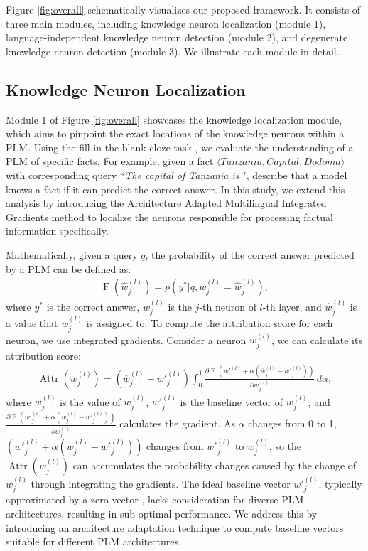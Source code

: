 \documentclass[]{article}
\begin{document}
Figure \ref{fig:overall} schematically visualizes our proposed framework. It consists of three main modules, including knowledge neuron localization (module 1), language-independent knowledge neuron detection (module 2), and degenerate knowledge neuron detection (module 3). We illustrate each module in detail.
\subsection{Knowledge Neuron Localization}
Module 1 of Figure \ref{fig:overall} showcases the knowledge localization module, which aims to pinpoint the exact locations of the knowledge neurons within a PLM. Using the fill-in-the-blank cloze task \cite{fill-in-the-blank}, we evaluate the understanding of a PLM of specific facts. For example, given a fact $\langle \textit{Tanzania}, \textit{Capital}, \textit{Dodoma} \rangle$ with corresponding query ``\textit{The capital of Tanzania is \underline{\hspace{0.4cm}}}", \citeauthor{fill-in-the-blank} describe that a model knows a fact if it can predict the correct answer. In this study, we extend this analysis by introducing the Architecture Adapted Multilingual Integrated Gradients method to localize the neurons responsible for processing factual information specifically.

Mathematically, given a query $q$, the probability of the correct answer predicted by a PLM can be defined as:
{\small \begin{align}
\label{eq:1}
\operatorname{F}(\hat{w}^{(l)}_{j}) = p(y^* | q, w^{(l)}_{j}=\hat{w}^ {(l)}_{j}),
\end{align}}where $y^*$ is the correct answer, ${w}^{(l)}_{j}$ is the $j$-th neuron of $l$-th layer, and $\hat{w}^ {(l)}_{j}$ is a value that ${w}^ {(l)}_{j}$ is assigned to. To compute the attribution score for each neuron, we use integrated gradients\cite{ig}. Consider a neuron ${w}^ {(l)}_{j}$, we can calculate its attribution score:
{\small
\begin{align}
\label{eqution:attribute}
\operatorname{Attr}({w}^{(l)}_{j}) = (\overline{w}^{(l)}_{j} - {w'}^{(l)}_{j}) \int_{0}^{1} \frac{\partial \operatorname{F}({w'}^{(l)}_{j} + \alpha(\overline{w}^{(l)}_{j} - {w'}^{(l)}_{j}))}{\partial {w}^{(l)}_{j}}  \, d\alpha,
\end{align}}where $\overline{w}^{(l)}_{j}$ is the value of ${w}^{(l)}_{j}$, ${w'}^{(l)}_{j}$ is the baseline vector of ${w}^{(l)}_{j}$, and $\frac{\partial \operatorname{F}({w'}^{(l)}_{j} + \alpha({w}^{(l)}_{j} - {w'}^{(l)}_{j}))}{\partial {w}^{(l)}_{j}}$ calculates the gradient. As $\alpha$ changes from 0 to 1, $({w'}^{(l)}_{j} + \alpha({w}^{(l)}_{j} - {w'}^{(l)}_{j}))$ changes from ${w'}^{(l)}_{j}$ to ${w}^{(l)}_{j}$, so the $\operatorname{Attr}({w}^{(l)}_{j})$ can accumulates the probability changes caused by the change of ${w}^{(l)}_{j}$ through integrating the gradients.
The ideal baseline vector ${w'}^{(l)}_{j}$, typically approximated by a zero vector \cite{transparent}, lacks consideration for diverse PLM architectures, resulting in sub-optimal performance. We address this by introducing an architecture adaptation technique to compute baseline vectors suitable for different PLM architectures.
\end{document}
